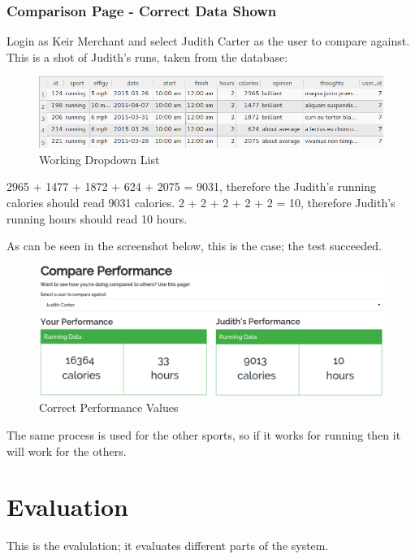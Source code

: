 \documentclass{article}[12pt,a4paper]
\begin{document}
{\subsubsection{Comparison Page - Correct Data Shown}
Login as Keir Merchant and select Judith Carter as the user to compare against. This is a shot of Judith's runs, taken from the database:

\begin{figure}[h!]
    \includegraphics[scale=0.35]{images/testing/compare_performance/judith_running}
    \caption{Working Dropdown List}
\end{figure}

2965 + 1477 + 1872 + 624 + 2075 = 9031, therefore the Judith's running calories should read 9031 calories.
2 + 2 + 2 + 2 + 2 = 10, therefore Judith's running hours should read 10 hours.

As can be seen in the screenshot below, this is the case; the test succeeded.

\begin{figure}[h!]
    \includegraphics[scale=0.35]{images/testing/compare_performance/performance}
    \caption{Correct Performance Values}
\end{figure}

The same process is used for the other sports, so if it works for running then it will work for the others.


\section{Evaluation}
This is the evalulation; it evaluates different parts of the system.

}
\end{document}
